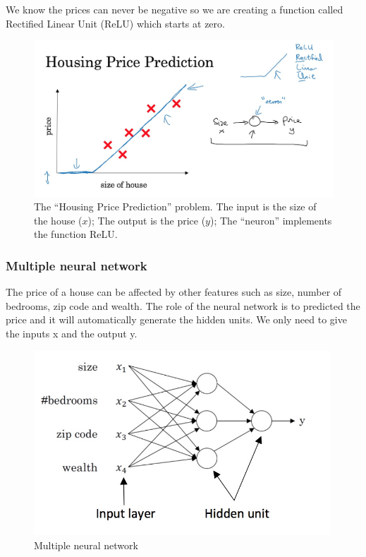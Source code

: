 \documentclass[UTF8]{article}
\begin{document}
We know the prices can never be negative so we are creating a function called Rectified Linear Unit
(ReLU) which starts at zero.
\begin{figure}[htb]
    \centering
    \includegraphics[width=40em]{figures/single-nn}
    \caption{The ``Housing Price Prediction'' problem. The input is the size of the house
    ($x$); The output is the price ($y$); The ``neuron'' implements the function
    ReLU.}
\end{figure}

\subsubsection{Multiple neural network}
The price of a house can be affected by other features such as size, number of bedrooms, zip code
and wealth. The role of the neural network is to predicted the price and it will automatically
generate the hidden units. We only need to give the inputs x and the output y.
\begin{figure}[htb]
    \centering
    \includegraphics[width=30em]{figures/multiple-nn}
    \caption{Multiple neural network}
\end{figure}
\end{document}
